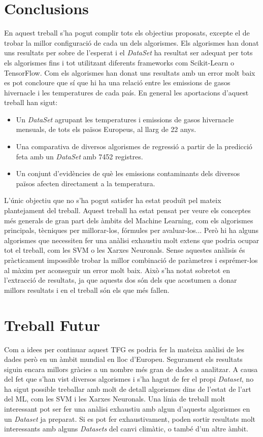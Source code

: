 \documentclass[10pt,a4paper,twocolumn,twoside]{article}
\begin{document}
\section {Conclusions}
En aquest treball s'ha pogut complir tots els objectius proposats, excepte el de trobar la millor configuració de cada un dels algorismes. Els algorismes han donat uns resultats per sobre de l'esperat i el \textit{DataSet} ha resultat ser adequat per tots els algorismes fins i tot utilitzant diferents frameworks com Scikit-Learn o TensorFlow. Com els algorismes han donat uns resultats amb un error molt baix es pot concloure que sí que hi ha una relació entre les emissions de gasos hivernacle i les temperatures de cada país. En general les aportacions d'aquest treball han sigut:
\begin{itemize}
\item Un \textit{DataSet} agrupant les temperatures i emissions de gasos hivernacle mensuals, de tots els països Europeus, al llarg de 22 anys.
\item Una comparativa de diversos algorismes de regressió a partir de la predicció feta amb un \textit{DataSet} amb 7452 registres.
\item Un conjunt d'evidències de què les emissions contaminants dels diversos països afecten directament a la temperatura.
\end{itemize}
L'únic objectiu que no s'ha pogut satisfer ha estat produït pel mateix plantejament del treball. Aquest treball ha estat pensat per veure els conceptes més generals de gran part dels àmbits del Machine Learning, com els algorismes principals, tècniques per millorar-los, fórmules per avaluar-los... Però hi ha alguns algorismes que necessiten fer una anàlisi exhaustiu molt extens que podria ocupar tot el treball, com les SVM o les Xarxes Neuronals. Sense aquestes anàlisis és pràcticament impossible trobar la millor combinació de paràmetres i esprémer-los al màxim per aconseguir un error molt baix. Això s'ha notat sobretot en l'extracció de resultats, ja que aquests dos són dels que acostumen a donar millors resultats i en el treball són els que més fallen.

\section{Treball Futur}
Com a idees per continuar aquest TFG es podria fer la mateixa anàlisi de les dades però en un àmbit mundial en lloc d'Europeu. Segurament els resultats siguin encara millors gràcies a un nombre més gran de dades a analitzar. A causa del fet que s'han vist diversos algorismes i s'ha hagut de fer el propi \textit{Dataset}, no ha sigut possible treballar amb molt de detall algorismes dins de l'estat de l'art del ML, com les SVM i les Xarxes Neuronals. Una línia de treball molt interessant pot ser fer una anàlisi exhaustiu amb algun d'aquests algorismes en un \textit{Dataset} ja preparat. Si es pot fer exhaustivament, poden sortir resultats molt interessants amb alguns \textit{Datasets} del canvi climàtic, o també d'un altre àmbit.
\end{document}
